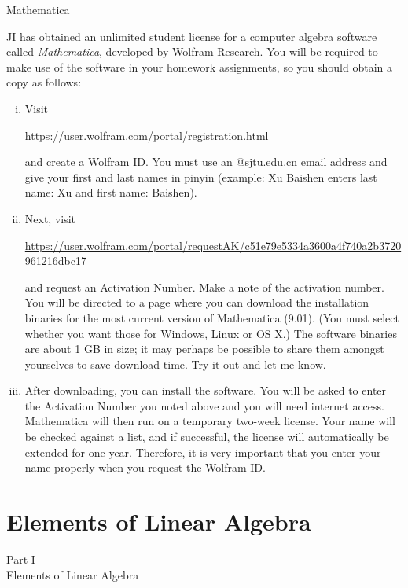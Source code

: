 \documentclass[smaller,hyperref={CJKbookmarks=true}]{beamer}
\begin{document}
\begin{frame}{Mathematica} \begin{spacing}{1.1}
JI has obtained an unlimited student license for a computer algebra
software called \textit{Mathematica}, developed by Wolfram Research. You will be
required to make use of the software in your homework assignments, so
you should obtain a copy as follows: \end{spacing}
\begin{enumerate}[(i)]
  \item Visit\begin{center}\url{https://user.wolfram.com/portal/registration.html}\end{center}and create a Wolfram ID. You must use an @sjtu.edu.cn email
address and give your first and last names in pinyin (example: Xu
Baishen enters last name: Xu and first name: Baishen).
  \item Next, visit\begin{center}\begin{scriptsize}\url{https://user.wolfram.com/portal/requestAK/c51e79e5334a3600a4f740a2b3720961216dbc17}\end{scriptsize}\end{center}
      and request an Activation Number. Make a note of the activation number. You will be directed to a page
where you can download the installation binaries for the most current
version of Mathematica (9.01). (You must select whether you want
those for Windows, Linux or OS X.) The software binaries are about
1 GB in size; it may perhaps be possible to share them amongst
yourselves to save download time. Try it out and let me know.
  \item After downloading, you can install the software. You will be asked to
enter the Activation Number you noted above and you will need
internet access. Mathematica will then run on a temporary two-week
license. Your name will be checked against a list, and if successful,
the license will automatically be extended for one year. Therefore, it
is very important that you enter your name properly when you
request the Wolfram ID.
\end{enumerate}
\end{frame}
\section{Elements of Linear Algebra}
\begin{frame}[c]
\begin{center}
  \Huge{Part I}\\ \alert{Elements of Linear Algebra}
\end{center}
\end{frame}
\begin{frame}[c] \begin{spacing}{2.5}
\tableofcontents[currentsubsection,hideothersubsections,sectionstyle=hide] \end{spacing}
\end{frame}
\renewcommand{\theequation}{\thesection.\arabic{subsection}.\arabic{equation}}
\end{document}
